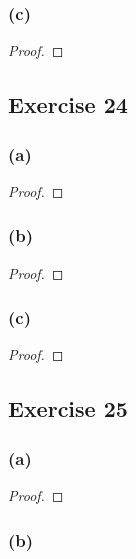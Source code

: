 \documentclass[14pt]{extarticle}
\begin{document}
\subsubsection{(c)}

\begin{proof}

\end{proof}

\subsection{Exercise 24}

\subsubsection{(a)}

\begin{proof}

\end{proof}

\subsubsection{(b)}

\begin{proof}

\end{proof}

\subsubsection{(c)}

\begin{proof}

\end{proof}

\subsection{Exercise 25}

\subsubsection{(a)}

\begin{proof}

\end{proof}

\subsubsection{(b)}
\end{document}
